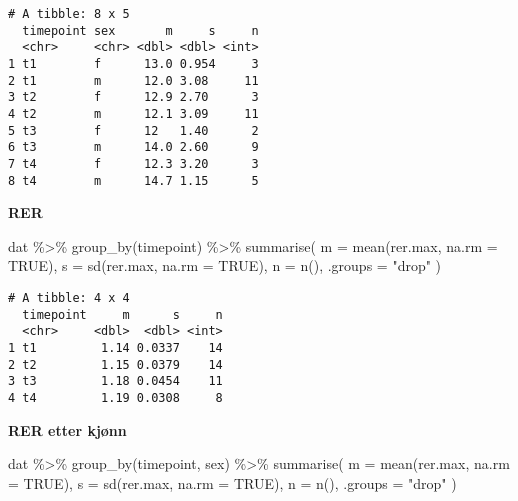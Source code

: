 \documentclass[
  letterpaper,
  DIV=11,
  numbers=noendperiod]{scrreprt}
\newenvironment{Shaded}{\begin{snugshade}}{\end{snugshade}}
\newcommand{\AttributeTok}[1]{\textcolor[rgb]{0.40,0.45,0.13}{#1}}
\newcommand{\ConstantTok}[1]{\textcolor[rgb]{0.56,0.35,0.01}{#1}}
\newcommand{\FunctionTok}[1]{\textcolor[rgb]{0.28,0.35,0.67}{#1}}
\newcommand{\NormalTok}[1]{\textcolor[rgb]{0.00,0.23,0.31}{#1}}
\newcommand{\SpecialCharTok}[1]{\textcolor[rgb]{0.37,0.37,0.37}{#1}}
\newcommand{\StringTok}[1]{\textcolor[rgb]{0.13,0.47,0.30}{#1}}
\begin{document}
\begin{verbatim}
# A tibble: 8 x 5
  timepoint sex       m     s     n
  <chr>     <chr> <dbl> <dbl> <int>
1 t1        f      13.0 0.954     3
2 t1        m      12.0 3.08     11
3 t2        f      12.9 2.70      3
4 t2        m      12.1 3.09     11
5 t3        f      12   1.40      2
6 t3        m      14.0 2.60      9
7 t4        f      12.3 3.20      3
8 t4        m      14.7 1.15      5
\end{verbatim}

\textbf{RER}

\begin{Shaded}
\begin{Highlighting}[]
\NormalTok{dat }\SpecialCharTok{\%\textgreater{}\%}
  \FunctionTok{group\_by}\NormalTok{(timepoint) }\SpecialCharTok{\%\textgreater{}\%}
  \FunctionTok{summarise}\NormalTok{(}
    \AttributeTok{m =} \FunctionTok{mean}\NormalTok{(rer.max, }\AttributeTok{na.rm =} \ConstantTok{TRUE}\NormalTok{),}
    \AttributeTok{s =} \FunctionTok{sd}\NormalTok{(rer.max, }\AttributeTok{na.rm =} \ConstantTok{TRUE}\NormalTok{),}
     \AttributeTok{n =} \FunctionTok{n}\NormalTok{(),}
    \AttributeTok{.groups =} \StringTok{"drop"}
\NormalTok{  )}
\end{Highlighting}
\end{Shaded}

\begin{verbatim}
# A tibble: 4 x 4
  timepoint     m      s     n
  <chr>     <dbl>  <dbl> <int>
1 t1         1.14 0.0337    14
2 t2         1.15 0.0379    14
3 t3         1.18 0.0454    11
4 t4         1.19 0.0308     8
\end{verbatim}

\textbf{RER etter kjønn}

\begin{Shaded}
\begin{Highlighting}[]
\NormalTok{dat }\SpecialCharTok{\%\textgreater{}\%}
  \FunctionTok{group\_by}\NormalTok{(timepoint, sex) }\SpecialCharTok{\%\textgreater{}\%}
  \FunctionTok{summarise}\NormalTok{(}
    \AttributeTok{m =} \FunctionTok{mean}\NormalTok{(rer.max, }\AttributeTok{na.rm =} \ConstantTok{TRUE}\NormalTok{),}
    \AttributeTok{s =} \FunctionTok{sd}\NormalTok{(rer.max, }\AttributeTok{na.rm =} \ConstantTok{TRUE}\NormalTok{),}
     \AttributeTok{n =} \FunctionTok{n}\NormalTok{(),}
    \AttributeTok{.groups =} \StringTok{"drop"}
\NormalTok{  )}
\end{Highlighting}
\end{Shaded}
\end{document}
